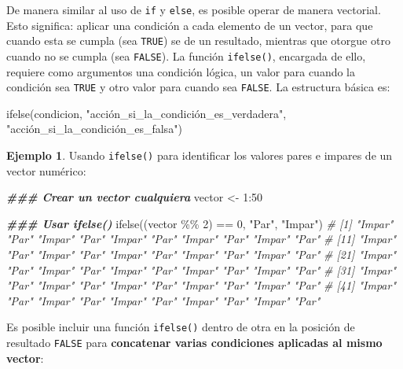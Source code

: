 \documentclass[
]{article}
\newenvironment{Shaded}{\begin{snugshade}}{\end{snugshade}}
\newcommand{\CommentTok}[1]{\textcolor[rgb]{0.56,0.35,0.01}{\textit{#1}}}
\newcommand{\DecValTok}[1]{\textcolor[rgb]{0.00,0.00,0.81}{#1}}
\newcommand{\DocumentationTok}[1]{\textcolor[rgb]{0.56,0.35,0.01}{\textbf{\textit{#1}}}}
\newcommand{\FunctionTok}[1]{\textcolor[rgb]{0.00,0.00,0.00}{#1}}
\newcommand{\NormalTok}[1]{#1}
\newcommand{\OtherTok}[1]{\textcolor[rgb]{0.56,0.35,0.01}{#1}}
\newcommand{\SpecialCharTok}[1]{\textcolor[rgb]{0.00,0.00,0.00}{#1}}
\newcommand{\StringTok}[1]{\textcolor[rgb]{0.31,0.60,0.02}{#1}}
\theoremstyle{definition}
\theoremstyle{definition}
\newtheorem{example}{Ejemplo}[section]
\theoremstyle{definition}
\theoremstyle{definition}
\theoremstyle{remark}
\begin{document}
De manera similar al uso de \texttt{if} y \texttt{else}, es posible operar de manera vectorial. Esto significa: aplicar una condición a cada elemento de un vector, para que cuando esta se cumpla (sea \texttt{TRUE}) se de un resultado, mientras que otorgue otro cuando no se cumpla (sea \texttt{FALSE}). La función \texttt{ifelse()}, encargada de ello, requiere como argumentos una condición lógica, un valor para cuando la condición sea \texttt{TRUE} y otro valor para cuando sea \texttt{FALSE}. La estructura básica es:

\begin{Shaded}
\begin{Highlighting}[]
\FunctionTok{ifelse}\NormalTok{(condicion, }\StringTok{"acción\_si\_la\_condición\_es\_verdadera"}\NormalTok{, }\StringTok{"acción\_si\_la\_condición\_es\_falsa"}\NormalTok{)}
\end{Highlighting}
\end{Shaded}

\begin{example}

Usando \texttt{ifelse()} para identificar los valores pares e impares de un vector numérico:

\begin{Shaded}
\begin{Highlighting}[]
\DocumentationTok{\#\#\# Crear un vector cualquiera}
\NormalTok{vector }\OtherTok{\textless{}{-}} \DecValTok{1}\SpecialCharTok{:}\DecValTok{50}

\DocumentationTok{\#\#\# Usar ifelse()}
\FunctionTok{ifelse}\NormalTok{((vector }\SpecialCharTok{\%\%} \DecValTok{2}\NormalTok{) }\SpecialCharTok{==} \DecValTok{0}\NormalTok{, }\StringTok{"Par"}\NormalTok{, }\StringTok{"Impar"}\NormalTok{)}
\CommentTok{\#  [1] "Impar" "Par"   "Impar" "Par"   "Impar" "Par"   "Impar" "Par"   "Impar" "Par"  }
\CommentTok{\# [11] "Impar" "Par"   "Impar" "Par"   "Impar" "Par"   "Impar" "Par"   "Impar" "Par"  }
\CommentTok{\# [21] "Impar" "Par"   "Impar" "Par"   "Impar" "Par"   "Impar" "Par"   "Impar" "Par"  }
\CommentTok{\# [31] "Impar" "Par"   "Impar" "Par"   "Impar" "Par"   "Impar" "Par"   "Impar" "Par"  }
\CommentTok{\# [41] "Impar" "Par"   "Impar" "Par"   "Impar" "Par"   "Impar" "Par"   "Impar" "Par"}
\end{Highlighting}
\end{Shaded}

\end{example}

Es posible incluir una función \texttt{ifelse()} dentro de otra en la posición de resultado \texttt{FALSE} para \textbf{concatenar varias condiciones aplicadas al mismo vector}:
\end{document}
